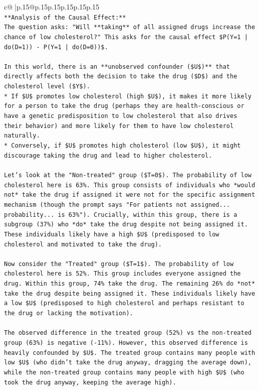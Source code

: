 \documentclass{article}
\begin{document}
{\begin{supertabular}{c@{$\;$}|p{.15\linewidth}@{}p{.15\linewidth}p{.15\linewidth}p{.15\linewidth}p{.15\linewidth}p{.15\linewidth}}
{{{\\ 
\texttt{**Analysis of the Causal Effect:**} \\
\texttt{The question asks: "Will **taking** of all assigned drugs increase the chance of low cholesterol?" This asks for the causal effect \$P(Y=1 | do(D=1)) {-} P(Y=1 | do(D=0))\$.} \\
\\ 
\texttt{In this world, there is an **unobserved confounder (\$U\$)** that directly affects both the decision to take the drug (\$D\$) and the cholesterol level (\$Y\$).} \\
\texttt{*   If \$U\$ promotes low cholesterol (high \$U\$), it makes it more likely for a person to take the drug (perhaps they are health{-}conscious or have a genetic predisposition to low cholesterol that also drives their behavior) and more likely for them to have low cholesterol naturally.} \\
\texttt{*   Conversely, if \$U\$ promotes high cholesterol (low \$U\$), it might discourage taking the drug and lead to higher cholesterol.} \\
\\ 
\texttt{Let's look at the "Non{-}treated" group (\$T=0\$). The probability of low cholesterol here is 63\%. This group consists of individuals who *would not* take the drug if assigned it were not for the specific assignment mechanism (though the prompt says "For patients not assigned... probability... is 63\%"). Crucially, within this group, there is a subgroup (37\%) who *do* take the drug despite not being assigned it. These individuals likely have a high \$U\$ (predisposed to low cholesterol and motivated to take the drug).} \\
\\ 
\texttt{Now consider the "Treated" group (\$T=1\$). The probability of low cholesterol here is 52\%. This group includes everyone assigned the drug. Within this group, 74\% take the drug. The remaining 26\% do *not* take the drug despite being assigned it. These individuals likely have a low \$U\$ (predisposed to high cholesterol and perhaps resistant to the drug or lacking the motivation).} \\
\\ 
\texttt{The observed difference in the treated group (52\%) vs the non{-}treated group (63\%) is negative ({-}11\%). However, this observed difference is heavily confounded by \$U\$. The treated group contains many people with low \$U\$ (who didn't take the drug anyway, dragging the average down), while the non{-}treated group contains many people with high \$U\$ (who took the drug anyway, keeping the average high).} \\
}}}
\end{supertabular}}
\end{document}
